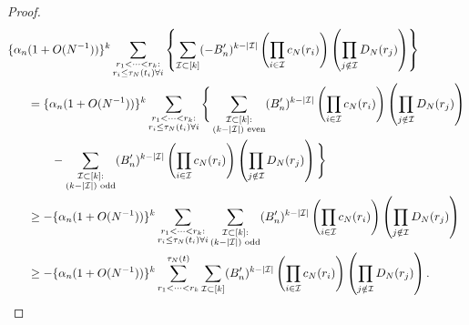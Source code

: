 \documentclass{article}
\newcommand{\1}[1]{\mathbbm{1}_{#1}}
\begin{document}
\begin{proof}
\begin{align}
\{ \alpha_n &(1 + O(N^{-1}) ) \}^k \sum_{\substack{r_1 <\dots< r_k :\\ r_i \leq \tau_N(t_i) \forall i}}
\left\{ \sum_{\mathcal{I} \subset [k]} (-B_n^\prime)^{k-|\mathcal{I}|}
\left( \prod_{i\in\mathcal{I}} c_N(r_i) \right)
\left( \prod_{j\notin\mathcal{I}} D_N(r_j) \right)
\right\} \notag\\
&= \{ \alpha_n (1 + O(N^{-1}) ) \}^k
\sum_{\substack{r_1 <\dots< r_k :\\ r_i \leq \tau_N(t_i) \forall i}}
\Bigg\{ \sum_{\substack{\mathcal{I} \subset [k]: \\ (k-|\mathcal{I}|) \text{ even} }} (B_n^\prime)^{k-|\mathcal{I}|}
\left( \prod_{i\in\mathcal{I}} c_N(r_i) \right)
\left( \prod_{j\notin\mathcal{I}} D_N(r_j) \right) \notag\\
&\qquad- \sum_{\substack{\mathcal{I} \subset [k]: \\ (k-|\mathcal{I}|) \text{ odd} }} (B_n^\prime)^{k-|\mathcal{I}|}
\left( \prod_{i\in\mathcal{I}} c_N(r_i) \right)
\left( \prod_{j\notin\mathcal{I}} D_N(r_j) \right) \Bigg\} \notag\\
&\geq - \{ \alpha_n (1 + O(N^{-1}) ) \}^k
\sum_{\substack{r_1 <\dots< r_k :\\ r_i \leq \tau_N(t_i) \forall i}}
\sum_{\substack{\mathcal{I} \subset [k]: \\ (k-|\mathcal{I}|) \text{ odd} }} (B_n^\prime)^{k-|\mathcal{I}|}
\left( \prod_{i\in\mathcal{I}} c_N(r_i) \right)
\left( \prod_{j\notin\mathcal{I}} D_N(r_j) \right) \notag\\
&\geq - \{ \alpha_n (1 + O(N^{-1}) ) \}^k
\sum_{r_1 <\dots< r_k}^{\tau_N(t)}
\sum_{ \mathcal{I} \subset [k] } (B_n^\prime)^{k-|\mathcal{I}|}
\left( \prod_{i\in\mathcal{I}} c_N(r_i) \right)
\left( \prod_{j\notin\mathcal{I}} D_N(r_j) \right) . \label{eq:79a}
\end{align}

\end{proof}
\end{document}

